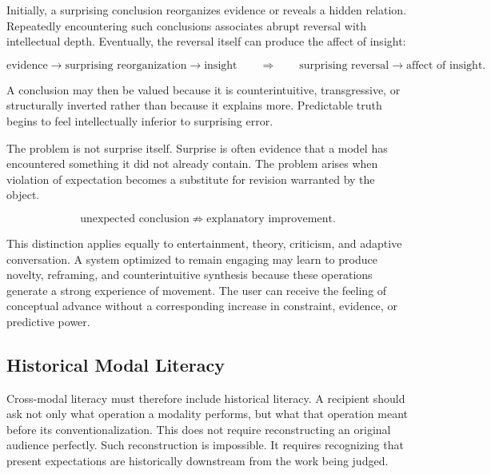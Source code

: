 \documentclass[11pt]{article}
\begin{document}
Initially, a surprising conclusion reorganizes evidence or reveals a hidden
relation. Repeatedly encountering such conclusions associates abrupt reversal
with intellectual depth. Eventually, the reversal itself can produce the
affect of insight:

\begin{equation}
  \text{evidence}
  \longrightarrow
  \text{surprising reorganization}
  \longrightarrow
  \text{insight}
  \qquad\Longrightarrow\qquad
  \text{surprising reversal}
  \longrightarrow
  \text{affect of insight}.
  \label{eq:surprise-short-circuit}
\end{equation}

A conclusion may then be valued because it is counterintuitive, transgressive,
or structurally inverted rather than because it explains more. Predictable
truth begins to feel intellectually inferior to surprising error.

The problem is not surprise itself. Surprise is often evidence that a model
has encountered something it did not already contain. The problem arises when
violation of expectation becomes a substitute for revision warranted by the
object.

\begin{equation}
  \text{unexpected conclusion}
  \not\Rightarrow
  \text{explanatory improvement}.
  \label{eq:surprise-improvement}
\end{equation}

This distinction applies equally to entertainment, theory, criticism, and
adaptive conversation. A system optimized to remain engaging may learn to
produce novelty, reframing, and counterintuitive synthesis because these
operations generate a strong experience of movement. The user can receive
the feeling of conceptual advance without a corresponding increase in
constraint, evidence, or predictive power.

\subsection{Historical Modal Literacy}

Cross-modal literacy must therefore include historical literacy. A recipient
should ask not only what operation a modality performs, but what that
operation meant before its conventionalization. This does not require
reconstructing an original audience perfectly. Such reconstruction is
impossible. It requires recognizing that present expectations are historically
downstream from the work being judged.
\end{document}

